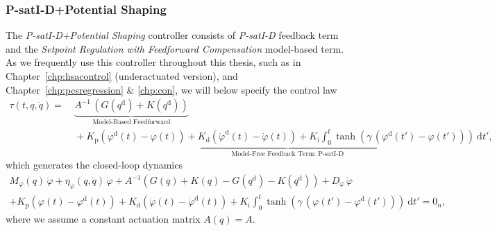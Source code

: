 \subsubsection{P-satI-D+Potential Shaping}
The \emph{P-satI-D+Potential Shaping} controller consists of \emph{P-satI-D} feedback term and the \emph{Setpoint Regulation with Feedforward Compensation} model-based term.
As we frequently use this controller throughout this thesis, such as in Chapter~\ref{chp:hsacontrol} (underactuated version), and Chapter~\ref{chp:pcsregression} \& \ref{chp:con}, we will below specify the control law
\begin{equation}
\begin{split}
    \tau(t,q,\dot{q}) =& \: \underbrace{A^{-1} \, \left ( G(q^\mathrm{d}) + K(q^\mathrm{d}) \right )}_\text{Model-Based Feedforward}\\
    & \: + \underbrace{K_\mathrm{p} \left (\varphi^\mathrm{d}(t) - \varphi(t) \right ) + K_\mathrm{d} \left ( \dot{\varphi}^\mathrm{d}(t) - \dot{\varphi}(t) \right ) + K_\mathrm{i} \int_0^t \tanh \left ( \gamma \, ( \varphi^\mathrm{d}(t')-\varphi(t') ) \right ) \: \mathrm{d} t'}_\text{Model-Free Feedback Term: P-satI-D},
\end{split}
\end{equation}
which generates the closed-loop dynamics
\begin{equation}
\begin{split}
    M_\varphi(q) \, \ddot{\varphi} + \eta_\varphi(q,\dot{q}) \, \dot{\varphi} + A^{-1} \left ( G(q) + K(q) - G(q^\mathrm{d}) - K(q^\mathrm{d}) \right ) + D_\varphi \, \dot{\varphi}\\
    + K_\mathrm{p} \left (\varphi(t) - \varphi^\mathrm{d}(t) \right ) + K_\mathrm{d} \left ( \dot{\varphi}(t) - \dot{\varphi}^\mathrm{d}(t) \right ) + K_\mathrm{i} \int_0^t \tanh \left ( \gamma \, ( \varphi(t')-\varphi^\mathrm{d}(t') ) \right ) \: \mathrm{d} t' = 0_n,
\end{split}
\end{equation}
where we assume a constant actuation matrix $A(q) = A$.


